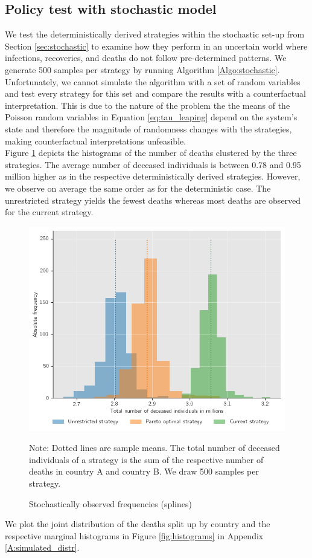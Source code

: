 \clearpage
\subsection{Policy test with stochastic model}
We test the deterministically derived strategies within the stochastic set-up from Section \ref{sec:stochastic} to examine how they perform in an uncertain world where infections, recoveries, and deaths do not follow pre-determined patterns. We generate 500 samples per strategy by running Algorithm \ref{Algo:stochastic}. Unfortunately, we cannot simulate the algorithm with a set of random variables and test every strategy for this set and compare the results with a counterfactual interpretation. This is due to the nature of the problem the the means of the Poisson random variables in Equation \eqref{eq:tau_leaping} depend on the system's state and therefore the magnitude of randomness changes with the strategies, making counterfactual interpretations unfeasible.  \\ 

Figure \ref{fig:results_splines_stochastic_histogram} depicts the histograms of the number of deaths clustered by the three strategies. The average number of deceased individuals is between 0.78 and 0.95 million higher as in the respective deterministically derived strategies. However, we observe on average the same order as for the deterministic case. The unrestricted strategy yields the fewest deaths whereas most deaths are observed for the current strategy. 
\begin{figure}[h!]
\centering
\includegraphics[scale=0.65]{images/splines_stochastic_histogram.png}
\begin{flushleft}
\scriptsize{Note:} Dotted lines are sample means. The total number of deceased individuals of a strategy is the sum of the respective number of deaths in country A and country B. We draw 500 samples per strategy. 
\end{flushleft}
\caption{Stochastically observed frequencies (splines)}
\label{fig:results_splines_stochastic_histogram}
\end{figure}
We plot the joint distribution of the deaths split up by country and the respective marginal histograms in Figure \ref{fig:histograms} in Appendix \ref{A:simulated_distr}.

